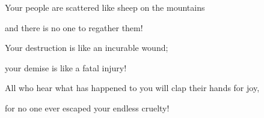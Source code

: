 {\par }{\Q Your people
are scattered
like sheep on
the mountains
\par }{\Q and there is no one
to regather them!
\par }{\Q {}Your destruction
is like an incurable
wound;
\par }{\Q your demise is like a fatal injury!

\par }{\Q All
who hear
what has happened
to you will clap
their hands
for
joy,

\par }{\PP for no
one
ever escaped
your endless
cruelty!
\par }